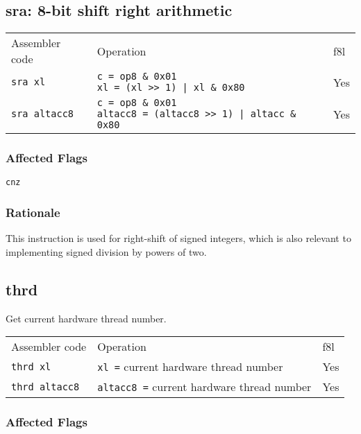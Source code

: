 \documentclass{book}
\begin{document}
\subsection{sra: 8-bit shift right arithmetic}

\begin{tabular}{l l l}
Assembler code       & Operation                                                                               & f8l \\
\texttt{sra xl}      & \makecell{\texttt{c = op8 \& 0x01}\\\texttt{xl = (xl >> 1) | xl \& 0x80}}               & Yes \\
\texttt{sra altacc8} & \makecell{\texttt{c = op8 \& 0x01}\\\texttt{altacc8 = (altacc8 >> 1) | altacc \& 0x80}} & Yes
\end{tabular}

\subsubsection*{Affected Flags}

\texttt{cnz}

\subsubsection*{Rationale}

This instruction is used for right-shift of signed integers, which is also relevant to implementing signed division by powers of two.

\subsection{thrd}

Get current hardware thread number.

\begin{tabular}{l l l}
Assembler code        & Operation                                         & f8l \\
\texttt{thrd xl}      & \texttt{xl =} current hardware thread number      & Yes \\
\texttt{thrd altacc8} & \texttt{altacc8 =} current hardware thread number & Yes \\
\end{tabular}

\subsubsection*{Affected Flags}
\end{document}
